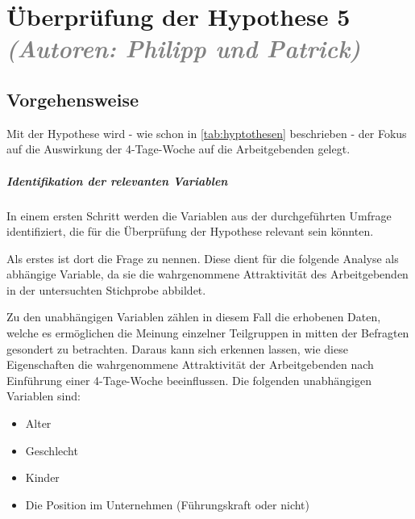 

\chapter{Überprüfung der Hypothese 5 \textit{\textcolor{gray}{(Autoren: Philipp und Patrick)}}}
\label{chap:hypothese5}


\section{Vorgehensweise}
Mit der Hypothese  wird - wie schon in \ref{tab:hyptothesen} beschrieben - der 
Fokus auf die Auswirkung der 4-Tage-Woche auf die Arbeitgebenden gelegt. 

\paragraph{Identifikation der relevanten Variablen}
In einem ersten Schritt werden die Variablen aus der durchgeführten Umfrage identifiziert, die für die 
Überprüfung der Hypothese relevant sein könnten.

Als erstes ist dort die Frage  zu nennen. Diese dient für die folgende Analyse als abhängige 
Variable, da sie die wahrgenommene Attraktivität des Arbeitgebenden in der untersuchten Stichprobe abbildet.

Zu den unabhängigen Variablen zählen in diesem Fall die erhobenen Daten, welche es ermöglichen die Meinung 
einzelner Teilgruppen in mitten der Befragten gesondert zu betrachten. Daraus kann sich erkennen lassen, wie diese
Eigenschaften die wahrgenommene Attraktivität der Arbeitgebenden nach Einführung einer 4-Tage-Woche beeinflussen.
Die folgenden unabhängigen Variablen sind:
\begin{itemize}
  \item Alter
  \item Geschlecht
  \item Kinder
  \item Die Position im Unternehmen (Führungskraft oder nicht)
\end{itemize}

